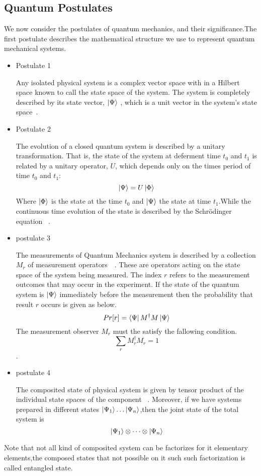 \subsection{Quantum Postulates}\hfill \break
We now consider the postulates of quantum mechanics, and their significance.The first postulate describes the mathematical structure we use to represent quantum mechanical systems.
\begin{itemize}
\item {Postulate 1}

Any isolated physical system is a complex vector space with in a Hilbert space known to call the state space of the system. The system is completely described by its state vector, $\ket{\Psi}$ , which is a unit vector in the system’s state space~\cite{book:17312}.
\item{Postulate 2}

The evolution of a closed quantum system is described by a unitary transformation. That is, the state of the system at deferment time $t_0$ and $t_1$ is related by a unitary operator, $U$, which depends only on the times period of time $t_0$ and $t_1$:
$$\ket{\Psi}=U\ket{\Phi}$$
Where $\ket{\Phi}$ is the state at the time $t_0$ and $\ket{\Psi}$ the state at time $t_1$.While the continuous time evolution of the state is described by the Schrödinger equation ~\cite{book:17312}.
\item{postulate 3}

The measurements of Quantum Mechanics system is described by a collection ${M_r }$ of measurement operators~\citep{book:17312}~. These are operators acting on the state space of the system being
measured. The index $r $ refers to the measurement outcomes that may occur in the experiment. If the state of the quantum system is $\ket{\Psi}$ immediately before the measurement then the probability that result $r$ occurs is given as below.
$$Pr[r]=\bra{\Psi}M^{\dagger} M\ket{\Psi}$$ 
The measurement observer ${M_r }$ must the satisfy the fallowing condition.
$$\sum_r M_{r}^{\dagger} M_r=1$$.


\item{postulate 4}

The composited state of physical system is given by tensor product of the individual state spaces of the component~\citep{book:889079} . Moreover, if we have systems prepared in different states $\ket{\Psi_1} \dots \ket{\Psi_n}$,then the joint state of the total system is
$$\ket{\Psi_1}\otimes\dots \otimes\ket{\Psi_n}$$
\end{itemize}
Note that not all kind of composited system can be factorizes for it elementary elements,the composed states that not possible on it such such factorization is called entangled state.
